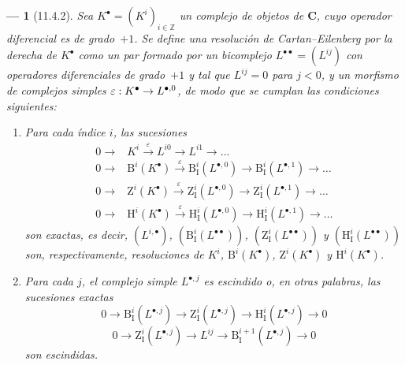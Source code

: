\documentclass[10pt,oneside,openany]{book}
\theoremstyle{egaenv}\newtheorem*{env}{---}
\theoremstyle{egastatement}
\theoremstyle{egadescription}
\newcommand{\oldpage}[2][]{\marginnote{\normalfont\scriptsize\textbf{#1}\,|\,#2}\ignorespaces}
\renewcommand{\to}{\mathchoice{\longrightarrow}{\rightarrow}{\rightarrow}{\rightarrow}}
\begin{document}
\begin{env}[11.4.2]
\label{0.11.4.2}
\label{0.11.4.2-fr}
Sea $K^\bullet=(K^i)_{i\in\mathbb Z}$ un complejo de objetos de $\boldsymbol{C}$, cuyo operador diferencial es de grado~$+1$.
Se define una \emph{resolución de Cartan--Eilenberg por la derecha} de $K^\bullet$ como un par formado por un bicomplejo $L^{\bullet\bullet}=(L^{ij})$ con operadores diferenciales de grado~$+1$ y tal que $L^{ij}=0$ para $j<0$, y un morfismo de complejos simples $\varepsilon:K^\bullet\to L^{\bullet,0}$, de modo que se cumplan las condiciones siguientes:
\oldpage[0\textsubscript{III}]{33}
\begin{enumerate}
  \item[(i)] Para cada índice $i$, las sucesiones
    \[
    \begin{aligned}
      0\longrightarrow{}&K^i\xrightarrow{\varepsilon}L^{i0}
        \longrightarrow L^{i1}\longrightarrow\ldots\\
      0\longrightarrow{}&\mathrm B^i(K^\bullet)\xrightarrow{\varepsilon}
        \mathrm B_{\mathrm I}^i(L^{\bullet,0})
        \longrightarrow\mathrm B_{\mathrm I}^i(L^{\bullet,1})
        \longrightarrow\ldots\\
      0\longrightarrow{}&\mathrm Z^i(K^\bullet)\xrightarrow{\varepsilon}
        \mathrm Z_{\mathrm I}^i(L^{\bullet,0})
        \longrightarrow\mathrm Z_{\mathrm I}^i(L^{\bullet,1})
        \longrightarrow\ldots\\
      0\longrightarrow{}&\mathrm H^i(K^\bullet)\xrightarrow{\varepsilon}
        \mathrm H_{\mathrm I}^i(L^{\bullet,0})
        \longrightarrow\mathrm H_{\mathrm I}^i(L^{\bullet,1})
        \longrightarrow\ldots
    \end{aligned}
    \]
    son exactas, es decir, $(L^{i,\bullet})$, $(\mathrm B_{\mathrm I}^i(L^{\bullet\bullet}))$, $(\mathrm Z_{\mathrm I}^i(L^{\bullet\bullet}))$ y
$(\mathrm H_{\mathrm I}^i(L^{\bullet\bullet}))$ son, respectivamente, \emph{resoluciones} de $K^i$, $\mathrm B^i(K^\bullet)$, $\mathrm Z^i(K^\bullet)$ y $\mathrm H^i(K^\bullet)$.
  \item[(ii)] Para cada $j$, el complejo simple $L^{\bullet,j}$ es \emph{escindido} o, en otras palabras, las sucesiones exactas
    \[
      \label{0.11.4.2.1-fr}
      0\longrightarrow\mathrm B_{\mathrm I}^i(L^{\bullet,j})
      \longrightarrow\mathrm Z_{\mathrm I}^i(L^{\bullet,j})
      \longrightarrow\mathrm H_{\mathrm I}^i(L^{\bullet,j})
      \longrightarrow0
      \tag{11.4.2.1}
    \]
    \[
      \label{0.11.4.2.2-fr}
      0\longrightarrow\mathrm Z_{\mathrm I}^i(L^{\bullet,j})
      \longrightarrow L^{ij}
      \longrightarrow\mathrm B_{\mathrm I}^{i+1}(L^{\bullet,j})
      \longrightarrow0
      \tag{11.4.2.2}
    \]
    son \emph{escindidas}.
\end{enumerate}


\end{env}
\end{document}
